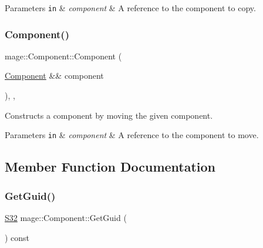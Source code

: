 \begin{DoxyParams}[1]{Parameters}
\mbox{\tt in}  & {\em component} & A reference to the component to copy. \\
\hline
\end{DoxyParams}
\hypertarget{classmage_1_1_component_a3abb21d27d4e89513787396c27b0ff6d}{}\label{classmage_1_1_component_a3abb21d27d4e89513787396c27b0ff6d} 
\subsubsection{\texorpdfstring{Component()}{Component()}\hspace{0.1cm}{\footnotesize\ttfamily [3/3]}}
{\footnotesize\ttfamily mage\+::\+Component\+::\+Component (\begin{DoxyParamCaption}\item[{\hyperlink{classmage_1_1_component}{Component} \&\&}]{component }\end{DoxyParamCaption})\hspace{0.3cm}{\ttfamily [protected]}, {\ttfamily [default]}, {\ttfamily [noexcept]}}

Constructs a component by moving the given component.


\begin{DoxyParams}[1]{Parameters}
\mbox{\tt in}  & {\em component} & A reference to the component to move. \\
\hline
\end{DoxyParams}


\subsection{Member Function Documentation}
\hypertarget{classmage_1_1_component_af5fedd0cb22d3fe5b26eec859eeff79f}{}\label{classmage_1_1_component_af5fedd0cb22d3fe5b26eec859eeff79f} 
\subsubsection{\texorpdfstring{Get\+Guid()}{GetGuid()}}
{\footnotesize\ttfamily \hyperlink{namespacemage_a642e05c5c83642b6946703615cdbf2da}{S32} mage\+::\+Component\+::\+Get\+Guid (\begin{DoxyParamCaption}{ }\end{DoxyParamCaption}) const\hspace{0.3cm}{\ttfamily [noexcept]}}


